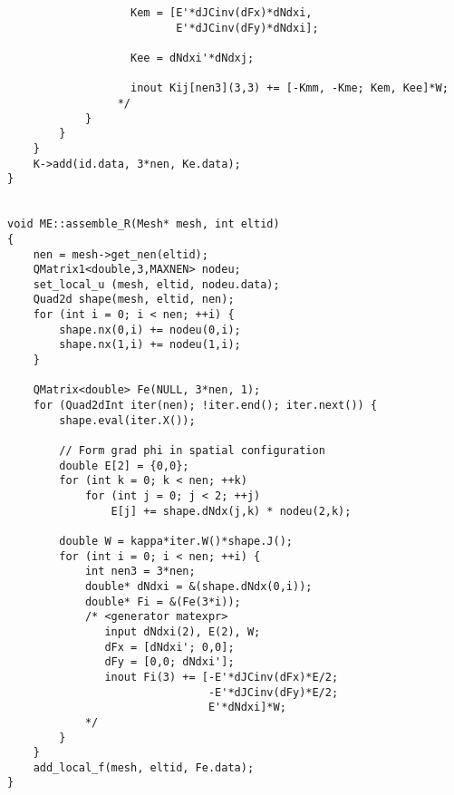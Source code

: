 \documentclass{article}
\begin{document}
\begin{verbatim}
                   Kem = [E'*dJCinv(dFx)*dNdxi,
                          E'*dJCinv(dFy)*dNdxi];

                   Kee = dNdxi'*dNdxj;

                   inout Kij[nen3](3,3) += [-Kmm, -Kme; Kem, Kee]*W;
                 */
            }
        }
    }
    K->add(id.data, 3*nen, Ke.data);
}


void ME::assemble_R(Mesh* mesh, int eltid)
{
    nen = mesh->get_nen(eltid);
    QMatrix1<double,3,MAXNEN> nodeu;
    set_local_u (mesh, eltid, nodeu.data);
    Quad2d shape(mesh, eltid, nen);
    for (int i = 0; i < nen; ++i) {
        shape.nx(0,i) += nodeu(0,i);
        shape.nx(1,i) += nodeu(1,i);
    }

    QMatrix<double> Fe(NULL, 3*nen, 1);
    for (Quad2dInt iter(nen); !iter.end(); iter.next()) {
        shape.eval(iter.X());

        // Form grad phi in spatial configuration
        double E[2] = {0,0};
        for (int k = 0; k < nen; ++k)
            for (int j = 0; j < 2; ++j)
                E[j] += shape.dNdx(j,k) * nodeu(2,k);

        double W = kappa*iter.W()*shape.J();
        for (int i = 0; i < nen; ++i) {
            int nen3 = 3*nen;
            double* dNdxi = &(shape.dNdx(0,i)); 
            double* Fi = &(Fe(3*i));
            /* <generator matexpr>
               input dNdxi(2), E(2), W;
               dFx = [dNdxi'; 0,0]; 
               dFy = [0,0; dNdxi'];
               inout Fi(3) += [-E'*dJCinv(dFx)*E/2;
                               -E'*dJCinv(dFy)*E/2;
                               E'*dNdxi]*W;
            */
        }
    }
    add_local_f(mesh, eltid, Fe.data);
}
\end{verbatim}
\end{document}
